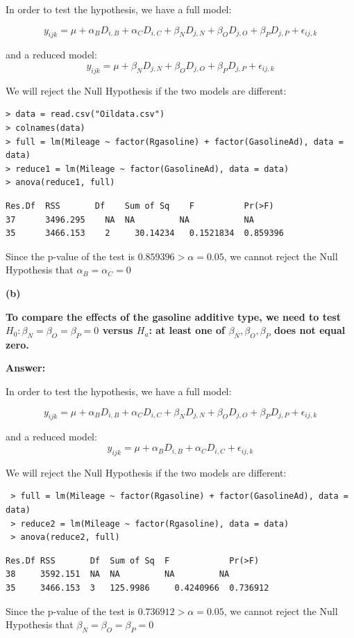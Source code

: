 \documentclass[letterpaper,11pt]{article}
\begin{document}
In order to test the hypothesis, we have a full model:

$$y_{ijk} = \mu + \alpha_BD_{i,B} + \alpha_CD_{i,C} + \beta_ND_{j,N} + \beta_OD_{j,O} + \beta_PD_{j,P} + \epsilon_{ij,k}$$

and a reduced model:
$$y_{ijk} = \mu + \beta_ND_{j,N} + \beta_OD_{j,O} + \beta_PD_{j,P} + \epsilon_{ij,k}$$

We will reject the Null Hypothesis if the two models are different:
\begin{lstlisting}
> data = read.csv("Oildata.csv")
> colnames(data)
> full = lm(Mileage ~ factor(Rgasoline) + factor(GasolineAd), data = data)
> reduce1 = lm(Mileage ~ factor(GasolineAd), data = data)
> anova(reduce1, full)
\end{lstlisting}

\begin{lstlisting}
Res.Df	RSS	      Df	Sum of Sq	 F	        Pr(>F)
37	    3496.295	NA	NA	       NA	        NA
35	    3466.153	2	  30.14234	 0.1521834	0.859396
\end{lstlisting}

Since the p-value of the test is $0.859396 > \alpha = 0.05$, we cannot reject the Null Hypothesis that $\alpha_B = \alpha_C = 0$


\begin{addmargin}[-1.1em]{0em}
  \textbf{(b)}\par
\end{addmargin}
\textbf{To compare the effects of the gasoline additive type, we need to test $H_0 :\beta_N =\beta_O =\beta_P =0$ versus $H_a$: at least one of $\beta_N,\beta_O,\beta_P$ does not equal zero.}\par
\bigbreak
\begin{addmargin}[-0.5em]{0em}
  \textbf{Answer: }
\end{addmargin}

 In order to test the hypothesis, we have a full model:

 $$y_{ijk} = \mu + \alpha_BD_{i,B} + \alpha_CD_{i,C} + \beta_ND_{j,N} + \beta_OD_{j,O} + \beta_PD_{j,P} + \epsilon_{ij,k}$$

 and a reduced model:
 $$y_{ijk} = \mu + \alpha_BD_{i,B} + \alpha_CD_{i,C} + \epsilon_{ij,k}$$

 We will reject the Null Hypothesis if the two models are different:
\begin{lstlisting}
 > full = lm(Mileage ~ factor(Rgasoline) + factor(GasolineAd), data = data)
 > reduce2 = lm(Mileage ~ factor(Rgasoline), data = data)
 > anova(reduce2, full)
\end{lstlisting}

\begin{lstlisting}
Res.Df RSS	     Df	 Sum of Sq	F	         Pr(>F)
38	   3592.151	 NA	 NA	        NA	       NA
35	   3466.153	 3	 125.9986	  0.4240966	 0.736912
\end{lstlisting}

Since the p-value of the test is $0.736912 > \alpha = 0.05$, we cannot reject the Null Hypothesis that $\beta_N = \beta_O =\beta_P = 0$
\end{document}
